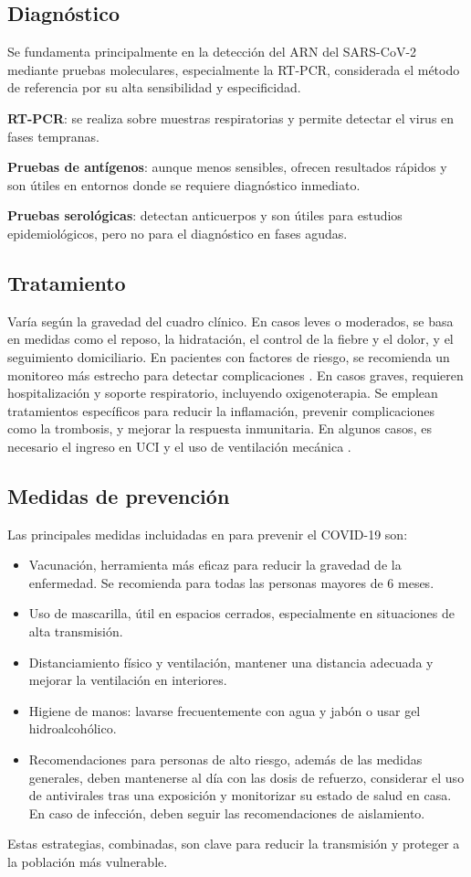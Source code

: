 \subsection{Diagnóstico}
Se fundamenta principalmente \cite{ko2022covid} en la detección del ARN del SARS-CoV-2 mediante pruebas moleculares, especialmente la RT-PCR, considerada el método de referencia por su alta sensibilidad y especificidad.

\textbf{RT-PCR}: se realiza sobre muestras respiratorias y permite detectar el virus en fases tempranas.

\textbf{Pruebas de antígenos}: aunque menos sensibles, ofrecen resultados rápidos y son útiles en entornos donde se requiere diagnóstico inmediato.

\textbf{Pruebas serológicas}: detectan anticuerpos y son útiles para estudios epidemiológicos, pero no para el diagnóstico en fases agudas.

\subsection{Tratamiento}
Varía según la gravedad del cuadro clínico. En casos leves o moderados, se basa en medidas como el reposo, la hidratación, el control de la fiebre y el dolor, y el seguimiento domiciliario. En pacientes con factores de riesgo, se recomienda un monitoreo más estrecho para detectar complicaciones \cite{qaseem2023outpatient}. En casos graves, requieren hospitalización y soporte respiratorio, incluyendo oxigenoterapia. Se emplean tratamientos específicos para reducir la inflamación, prevenir complicaciones como la trombosis, y mejorar la respuesta inmunitaria. En algunos casos, es necesario el ingreso en UCI y el uso de ventilación mecánica \cite{wiersinga2020pathophysiology}.

\subsection{Medidas de prevención}
Las principales medidas incluidadas en \cite{hutchins2020covid} para prevenir el COVID-19 son:
\begin{itemize}
    \item Vacunación, herramienta más eficaz para reducir la gravedad de la enfermedad. Se recomienda para todas las personas mayores de 6 meses.
    \item Uso de mascarilla, útil en espacios cerrados, especialmente en situaciones de alta transmisión.
    \item Distanciamiento físico y ventilación, mantener una distancia adecuada y mejorar la ventilación en interiores.
    \item Higiene de manos: lavarse frecuentemente con agua y jabón o usar gel hidroalcohólico.
    \item Recomendaciones para personas de alto riesgo, además de las medidas generales, deben mantenerse al día con las dosis de refuerzo, considerar el uso de antivirales tras una exposición y monitorizar su estado de salud en casa. En caso de infección, deben seguir las recomendaciones de aislamiento.
\end{itemize} 
Estas estrategias, combinadas, son clave para reducir la transmisión y proteger a la población más vulnerable.

